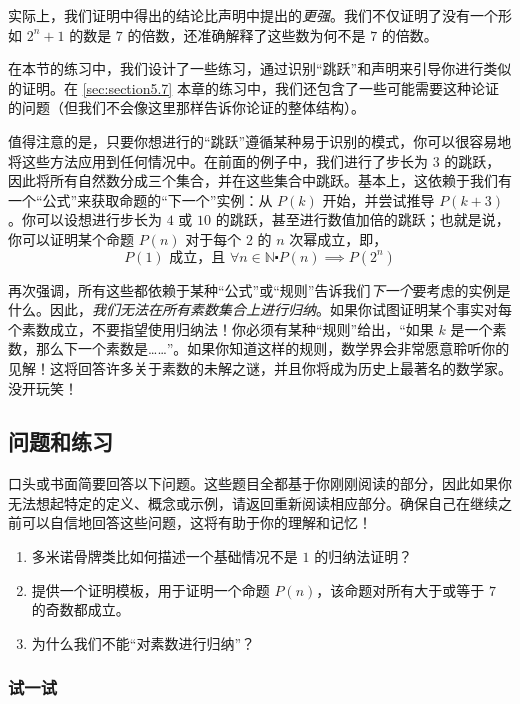 实际上，我们证明中得出的结论比声明中提出的\emph{更强}。我们不仅证明了没有一个形如 $2^n + 1$ 的数是 $7$ 的倍数，还准确解释了这些数为何不是 $7$ 的倍数。

在本节的练习中，我们设计了一些练习，通过识别``跳跃''和声明来引导你进行类似的证明。在 \ref{sec:section5.7} 本章的练习中，我们还包含了一些可能需要这种论证的问题（但我们不会像这里那样告诉你论证的整体结构）。

值得注意的是，只要你想进行的``跳跃''遵循某种易于识别的模式，你可以很容易地将这些方法应用到任何情况中。在前面的例子中，我们进行了步长为 $3$ 的跳跃，因此将所有自然数分成三个集合，并在这些集合中跳跃。基本上，这依赖于我们有一个``公式''来获取命题的``下一个''实例：从 $P(k)$ 开始，并尝试推导 $P(k + 3)$。你可以设想进行步长为 $4$ 或 $10$ 的跳跃，甚至进行数值加倍的跳跃；也就是说，你可以证明某个命题 $P(n)$ 对于每个 $2$ 的 $n$ 次幂成立，即，
\[P(1) \text{ 成立，且 } \forall n \in \mathbb{N} \centerdot P(n) \implies P(2^n)\]

再次强调，所有这些都依赖于某种``公式''或``规则''告诉我们\emph{下一个}要考虑的实例是什么。因此，\emph{我们无法在所有素数集合上进行归纳}。如果你试图证明某个事实对每个素数成立，不要指望使用归纳法！你必须有某种``规则''给出，``如果 $k$ 是一个素数，那么下一个素数是……''。如果你知道这样的规则，数学界会非常愿意聆听你的见解！这将回答许多关于素数的未解之谜，并且你将成为历史上最著名的数学家。没开玩笑！

\subsection{问题和练习}\label{sec:section5.3.4}

口头或书面简要回答以下问题。这些题目全都基于你刚刚阅读的部分，因此如果你无法想起特定的定义、概念或示例，请返回重新阅读相应部分。确保自己在继续之前可以自信地回答这些问题，这将有助于你的理解和记忆！

\begin{enumerate}[label=(\arabic*)]
    \item 多米诺骨牌类比如何描述一个基础情况不是 $1$ 的归纳法证明？
    \item 提供一个证明模板，用于证明一个命题 $P(n)$，该命题对所有大于或等于 $7$ 的奇数都成立。
    \item 为什么我们不能``对素数进行归纳''？
\end{enumerate}

\subsubsection*{试一试}

